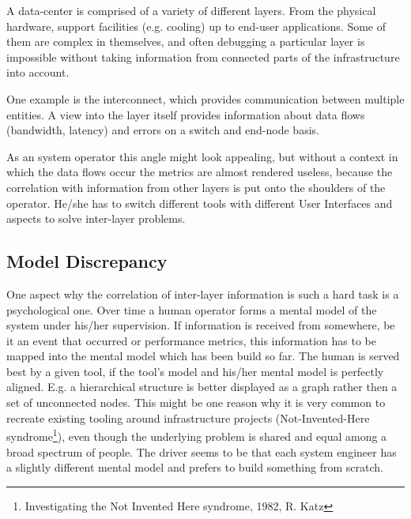 A data-center is comprised of a variety of different layers. From the physical hardware, support facilities (e.g. cooling) up to end-user applications.
Some of them are complex in themselves, and often debugging a particular layer is impossible without taking information from connected parts
of the infrastructure into account.

One example is the interconnect, which provides communication between multiple entities.
A view into the layer itself provides information about data flows (bandwidth, latency) and errors on a switch and end-node basis.

As an system operator this angle might look appealing, but without a context in which the data flows occur the metrics are almost rendered useless,
because the correlation with information from other layers is put onto the shoulders of the operator.
He/she has to switch different tools with different User Interfaces and aspects to solve inter-layer problems.
\subsection{Model Discrepancy}
One aspect why the correlation of inter-layer information is such a hard task is a psychological one. Over time a human operator forms a mental model
of the system under his/her supervision. If information is received from somewhere, be it an event that occurred or performance metrics, this information
has to be mapped into the mental model which has been build so far.
The human is served best by a given tool, if the tool's model and his/her mental model is perfectly aligned.
E.g. a hierarchical structure is better displayed as a graph rather then a set of unconnected nodes.
This might be one reason why it is very common to recreate existing tooling around infrastructure projects
(Not-Invented-Here syndrome\footnote{Investigating the Not Invented Here syndrome, 1982, R. Katz}), even though the underlying problem
is shared and equal among a broad spectrum of people. The driver seems to be that each system engineer has a slightly different mental
model and prefers to build something from scratch.


